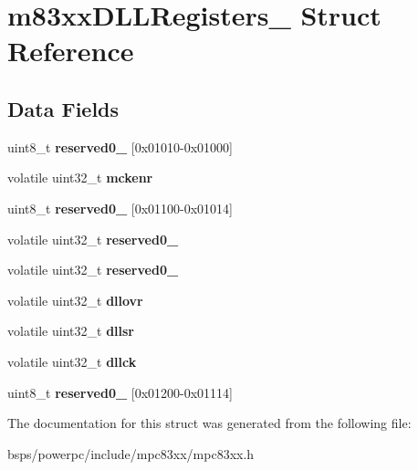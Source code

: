 \hypertarget{structm83xxDLLRegisters__}{}\section{m83xx\+D\+L\+L\+Registers\+\_\+ Struct Reference}
\label{structm83xxDLLRegisters__}
\subsection*{Data Fields}
\begin{DoxyCompactItemize}
\item 
\mbox{\label{structm83xxDLLRegisters___ab590589afa0ede6427b8dfdb5e10a3cb}} 
uint8\+\_\+t {\bfseries reserved0\+\_} \mbox{[}0x01010-\/0x01000\mbox{]}
\item 
\mbox{\label{structm83xxDLLRegisters___af5e654ffe40260a7fea653c51062cdde}} 
volatile uint32\+\_\+t {\bfseries mckenr}
\item 
\mbox{\label{structm83xxDLLRegisters___a4f5903f734a8ee66a0c68470d51f8d76}} 
uint8\+\_\+t {\bfseries reserved0\+\_} \mbox{[}0x01100-\/0x01014\mbox{]}
\item 
\mbox{\label{structm83xxDLLRegisters___a32b57c52b43aa67a88f951514b511c75}} 
volatile uint32\+\_\+t {\bfseries reserved0\+\_}
\item 
\mbox{\label{structm83xxDLLRegisters___a264812c354076d7aa28314ed1fa9f523}} 
volatile uint32\+\_\+t {\bfseries reserved0\+\_}
\item 
\mbox{\label{structm83xxDLLRegisters___ac0bcd1a85b8663f4335d0aeb61040187}} 
volatile uint32\+\_\+t {\bfseries dllovr}
\item 
\mbox{\label{structm83xxDLLRegisters___a67935d0f51d24d41a3bd02799ef9946b}} 
volatile uint32\+\_\+t {\bfseries dllsr}
\item 
\mbox{\label{structm83xxDLLRegisters___afe653f0e759ca217f8cfe3b6acffd135}} 
volatile uint32\+\_\+t {\bfseries dllck}
\item 
\mbox{\label{structm83xxDLLRegisters___a8802348736be260766fdb80c080f37b8}} 
uint8\+\_\+t {\bfseries reserved0\+\_} \mbox{[}0x01200-\/0x01114\mbox{]}
\end{DoxyCompactItemize}


The documentation for this struct was generated from the following file\+:\begin{DoxyCompactItemize}
\item 
bsps/powerpc/include/mpc83xx/mpc83xx.\+h\end{DoxyCompactItemize}
